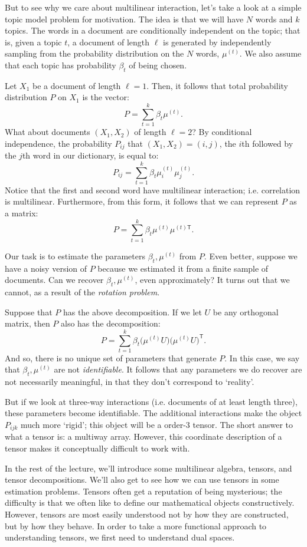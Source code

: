 But to see why we care about multilinear interaction, let's take a
look at a simple topic model problem for motivation. The idea is that
we will have $N$ words and $k$ topics. The words in a document are
conditionally independent on the topic; that is, given a topic $t$, a
document of length $\ell$ is generated by independently sampling from
the probability distribution on the $N$ words, $\mu^{(t)}$. We also
assume that each topic has probability  $\beta_t$ of being chosen. 

Let $X_1$ be a document of length $\ell = 1$. Then, it follows that
total probability distribution $P$ on $X_1$ is the vector: 
\[P = \sum_{t=1}^k \beta_t \mu^{(t)}. \]
What about documents $(X_1, X_2)$ of length $\ell = 2$? By conditional
independence, the probability $P_{ij}$ that $(X_1,X_2) = (i,j)$, the
$i$th followed by the $j$th word in our dictionary, is equal to: 
\[P_{ij} = \sum_{t=1}^k \beta_t \mu^{(t)}_i \mu^{(t)}_j.\]
Notice that the first and second word have multilinear interaction;
i.e. correlation is multilinear. Furthermore, from this form, it
follows that we can represent $P$ as a matrix: 
\[P = \sum_{t=1}^k\beta_t \mu^{(t)} \mu^{(t)\mathsf{T}}.\]

Our task is to estimate the parameters $\beta_t, \mu^{(t)}$ from
$P$. Even better, suppose we have a noisy version of $P$ because we
estimated it from a finite sample of documents. Can we recover
$\beta_t, \mu^{(t)}$, even approximately? It turns out that we cannot,
as a result of the \emph{rotation problem}. 

Suppose that $P$ has the above decomposition. If we let $U$ be any
orthogonal matrix, then $P$ also has the decomposition: 
\[P = \sum_{t=1}^k \beta_t \big(\mu^{(t)} U\big)\big(\mu^{(t)}
U\big)^\mathsf{T}.\] 
And so, there is no unique set of parameters that generate $P$. In
this case, we say that $\beta_t, \mu^{(t)}$ are not
\emph{identifiable}. It follows that any parameters we do recover are
not necessarily meaningful, in that they don't correspond to
`reality'. 

But if we look at three-way interactions (i.e. documents of at least
length three), these parameters become identifiable. The additional
interactions make the object $P_{ijk}$ much more `rigid'; this object
will be a order-3 tensor. The short answer to what a tensor is: a
multiway array. However, this coordinate description of a tensor makes
it conceptually difficult to work with. 



In the rest of the lecture, we'll introduce some multilinear algebra,
tensors, and tensor decompositions. We'll also get to see how we can
use tensors in some estimation problems. Tensors often get a
reputation of being mysterious; the difficulty is that we often like
to define our mathematical objects constructively. However, tensors
are most easily understood not by how they are constructed, but by how
they behave. In order to take a more functional approach to
understanding tensors, we first need to understand dual spaces. 

